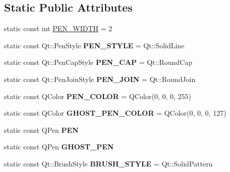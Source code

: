 \subsection*{Static Public Attributes}
\begin{DoxyCompactItemize}
\item 
static const int \hyperlink{classBuildingGUI_a586063fa325a479fb3f0e6bafb15b052}{P\-E\-N\-\_\-\-W\-I\-D\-T\-H} = 2
\item 
\hypertarget{classBuildingGUI_aff4481c968fbd6718acd5ebd5540ab9e}{static const Qt\-::\-Pen\-Style {\bfseries P\-E\-N\-\_\-\-S\-T\-Y\-L\-E} = Qt\-::\-Solid\-Line}\label{classBuildingGUI_aff4481c968fbd6718acd5ebd5540ab9e}

\item 
\hypertarget{classBuildingGUI_ada34a1c3117d090456d66954730262f5}{static const Qt\-::\-Pen\-Cap\-Style {\bfseries P\-E\-N\-\_\-\-C\-A\-P} = Qt\-::\-Round\-Cap}\label{classBuildingGUI_ada34a1c3117d090456d66954730262f5}

\item 
\hypertarget{classBuildingGUI_a28011806cf0c43237f993b01f6f68ef0}{static const Qt\-::\-Pen\-Join\-Style {\bfseries P\-E\-N\-\_\-\-J\-O\-I\-N} = Qt\-::\-Round\-Join}\label{classBuildingGUI_a28011806cf0c43237f993b01f6f68ef0}

\item 
\hypertarget{classBuildingGUI_a75148840cfcec3abe78d5938f6730549}{static const Q\-Color {\bfseries P\-E\-N\-\_\-\-C\-O\-L\-O\-R} = Q\-Color(0, 0, 0, 255)}\label{classBuildingGUI_a75148840cfcec3abe78d5938f6730549}

\item 
\hypertarget{classBuildingGUI_a179846d692640f271a28cceddf185c4f}{static const Q\-Color {\bfseries G\-H\-O\-S\-T\-\_\-\-P\-E\-N\-\_\-\-C\-O\-L\-O\-R} = Q\-Color(0, 0, 0, 127)}\label{classBuildingGUI_a179846d692640f271a28cceddf185c4f}

\item 
\hypertarget{classBuildingGUI_a2bdc5204e87df75948f8f5c851505218}{static const Q\-Pen {\bfseries P\-E\-N}}\label{classBuildingGUI_a2bdc5204e87df75948f8f5c851505218}

\item 
\hypertarget{classBuildingGUI_afdf9bae63f17079d3ec49d85ff24b0b3}{static const Q\-Pen {\bfseries G\-H\-O\-S\-T\-\_\-\-P\-E\-N}}\label{classBuildingGUI_afdf9bae63f17079d3ec49d85ff24b0b3}

\item 
\hypertarget{classBuildingGUI_ae0eaee99389f670baf7ff080dd2ba774}{static const Qt\-::\-Brush\-Style {\bfseries B\-R\-U\-S\-H\-\_\-\-S\-T\-Y\-L\-E} = Qt\-::\-Solid\-Pattern}\label{classBuildingGUI_ae0eaee99389f670baf7ff080dd2ba774}


\end{DoxyCompactItemize}
